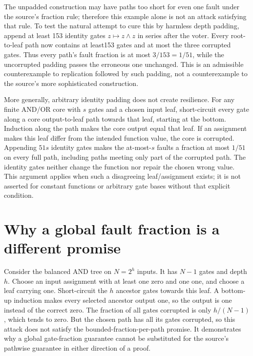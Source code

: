 \documentclass[11pt]{article}
\begin{document}
The unpadded construction may have paths too short for even one
fault under the source's fraction rule; therefore this example
alone is not an attack satisfying that rule. To test the natural
attempt to cure this by harmless depth padding, append at least
153 identity gates $z\mapsto z\wedge z$ in series after the
voter. Every root-to-leaf path now contains at least153 gates
and at most the three corrupted gates. Thus every path's fault
fraction is at most $3/153=1/51$, while the uncorrupted padding
passes the erroneous one unchanged. This is an admissible
counterexample to replication followed by such padding, not a
counterexample to the source's more sophisticated construction.

More generally, arbitrary identity padding does not create
resilience. For any finite AND/OR core with $s$ gates and a
chosen input leaf, short-circuit every gate along a core
output-to-leaf path towards that leaf, starting at the bottom.
Induction along the path makes the core output equal that leaf.
If an assignment makes this leaf differ from the intended
function value, the core is corrupted. Appending $51s$ identity
gates makes the at-most-$s$ faults a fraction at most $1/51$
on every full path, including paths meeting only part of the
corrupted path. The identity gates neither change the function
nor repair the chosen wrong value. This argument applies when
such a disagreeing leaf/assignment exists; it is not asserted
for constant functions or arbitrary gate bases without that
explicit condition.

\section{Why a global fault fraction is a different promise}
Consider the balanced AND tree on $N=2^h$ inputs. It has
$N-1$ gates and depth $h$. Choose an input assignment with at
least one zero and one one, and choose a leaf carrying one.
Short-circuit the $h$ ancestor gates towards this leaf. A
bottom-up induction makes every selected ancestor output one,
so the output is one instead of the correct zero. The fraction
of all gates corrupted is only $h/(N-1)$, which tends to zero.
But the chosen path has all its gates corrupted, so this attack
does not satisfy the bounded-fraction-per-path promise.
It demonstrates why a global gate-fraction guarantee cannot
be substituted for the source's pathwise guarantee in either
direction of a proof.
\end{document}
